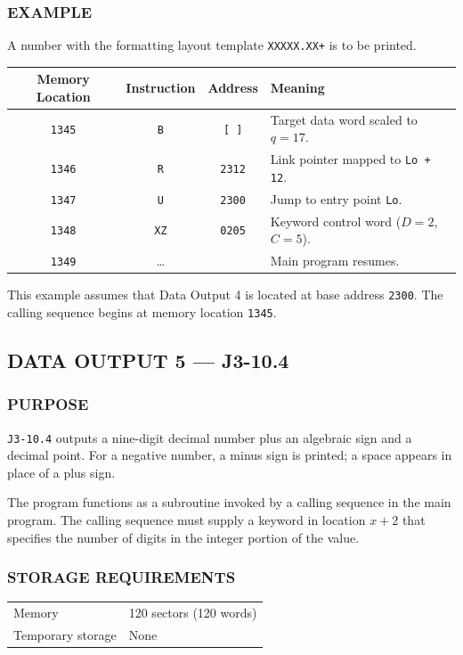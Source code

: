 \subsubsection*{EXAMPLE}
A number with the formatting layout template \texttt{XXXXX.XX+} is to be printed.
\begin{table}[h!]
\centering
\begin{tabularx}{\textwidth}{cccX}
\toprule
\textbf{Memory Location} & \textbf{Instruction} & \textbf{Address} & \textbf{Meaning} \\
\midrule
\texttt{1345} & \texttt{B}  & \texttt{[ ]}  & Target data word scaled to $q=17$. \\
\texttt{1346} & \texttt{R}  & \texttt{2312} & Link pointer mapped to \texttt{Lo + 12}. \\
\texttt{1347} & \texttt{U}  & \texttt{2300} & Jump to entry point \texttt{Lo}. \\
\texttt{1348} & \texttt{XZ} & \texttt{0205} & Keyword control word ($D=2$, $C=5$). \\
\texttt{1349} & \dots       &                & Main program resumes. \\
\bottomrule
\end{tabularx}
\end{table}
This example assumes that Data Output 4 is located at base address \texttt{2300}. The calling sequence begins at memory location \texttt{1345}.
\newpage
\subsection*{DATA OUTPUT 5 --- J3-10.4}
\label{sec:data-output-5}

\subsubsection*{PURPOSE}
\texttt{J3-10.4} outputs a nine-digit decimal number plus an algebraic sign and a decimal point. For a negative number, a minus sign is printed; a space appears in place of a plus sign.

The program functions as a subroutine invoked by a calling sequence in the main program. The calling sequence must supply a keyword in location $x+2$ that specifies the number of digits in the integer portion of the value.

\subsubsection*{STORAGE REQUIREMENTS}
\begin{center}
\begin{tabular}{ll}
    \toprule
    Memory & 120 sectors (120 words) \\
    Temporary storage    & None \\
    \bottomrule
\end{tabular}
\end{center}

